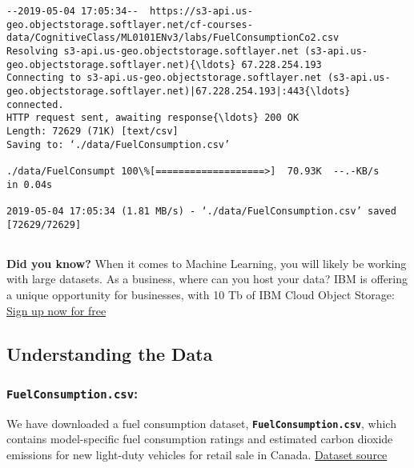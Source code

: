 \documentclass[11pt]{article}
\begin{document}
    \begin{Verbatim}[commandchars=\\\{\}]
--2019-05-04 17:05:34--  https://s3-api.us-geo.objectstorage.softlayer.net/cf-courses-data/CognitiveClass/ML0101ENv3/labs/FuelConsumptionCo2.csv
Resolving s3-api.us-geo.objectstorage.softlayer.net (s3-api.us-geo.objectstorage.softlayer.net){\ldots} 67.228.254.193
Connecting to s3-api.us-geo.objectstorage.softlayer.net (s3-api.us-geo.objectstorage.softlayer.net)|67.228.254.193|:443{\ldots} connected.
HTTP request sent, awaiting response{\ldots} 200 OK
Length: 72629 (71K) [text/csv]
Saving to: ‘./data/FuelConsumption.csv’

./data/FuelConsumpt 100\%[===================>]  70.93K  --.-KB/s    in 0.04s   

2019-05-04 17:05:34 (1.81 MB/s) - ‘./data/FuelConsumption.csv’ saved [72629/72629]


    \end{Verbatim}

    \textbf{Did you know?} When it comes to Machine Learning, you will
likely be working with large datasets. As a business, where can you host
your data? IBM is offering a unique opportunity for businesses, with 10
Tb of IBM Cloud Object Storage:
\href{http://cocl.us/ML0101EN-IBM-Offer-CC}{Sign up now for free}

    \hypertarget{understanding-the-data}{%
\subsection{Understanding the Data}\label{understanding-the-data}}

\hypertarget{fuelconsumption.csv}{%
\subsubsection{\texorpdfstring{\texttt{FuelConsumption.csv}:}{FuelConsumption.csv:}}\label{fuelconsumption.csv}}

We have downloaded a fuel consumption dataset,
\textbf{\texttt{FuelConsumption.csv}}, which contains model-specific
fuel consumption ratings and estimated carbon dioxide emissions for new
light-duty vehicles for retail sale in Canada.
\href{http://open.canada.ca/data/en/dataset/98f1a129-f628-4ce4-b24d-6f16bf24dd64}{Dataset
source}
\end{document}
